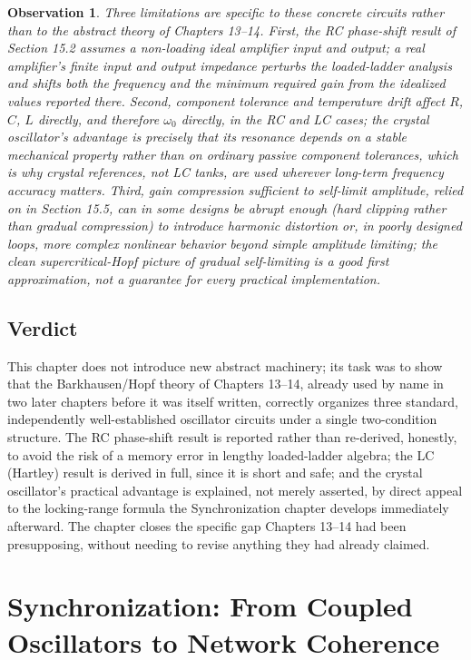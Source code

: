 \documentclass[12pt]{article}
\newtheorem{observation}{Observation}
\begin{document}
\begin{observation}
Three limitations are specific to these concrete circuits rather than to the abstract theory of Chapters 13--14. First, the RC phase-shift result of Section 15.2 assumes a non-loading ideal amplifier input and output; a real amplifier's finite input and output impedance perturbs the loaded-ladder analysis and shifts both the frequency and the minimum required gain from the idealized values reported there. Second, component tolerance and temperature drift affect $R$, $C$, $L$ directly, and therefore $\omega_0$ directly, in the RC and LC cases; the crystal oscillator's advantage is precisely that its resonance depends on a stable mechanical property rather than on ordinary passive component tolerances, which is why crystal references, not LC tanks, are used wherever long-term frequency accuracy matters. Third, gain compression sufficient to self-limit amplitude, relied on in Section 15.5, can in some designs be abrupt enough (hard clipping rather than gradual compression) to introduce harmonic distortion or, in poorly designed loops, more complex nonlinear behavior beyond simple amplitude limiting; the clean supercritical-Hopf picture of gradual self-limiting is a good first approximation, not a guarantee for every practical implementation.
\end{observation}

\subsection{Verdict}

This chapter does not introduce new abstract machinery; its task was to show that the Barkhausen/Hopf theory of Chapters 13--14, already used by name in two later chapters before it was itself written, correctly organizes three standard, independently well-established oscillator circuits under a single two-condition structure. The RC phase-shift result is reported rather than re-derived, honestly, to avoid the risk of a memory error in lengthy loaded-ladder algebra; the LC (Hartley) result is derived in full, since it is short and safe; and the crystal oscillator's practical advantage is explained, not merely asserted, by direct appeal to the locking-range formula the Synchronization chapter develops immediately afterward. The chapter closes the specific gap Chapters 13--14 had been presupposing, without needing to revise anything they had already claimed.

\section*{Synchronization: From Coupled Oscillators to Network Coherence}
\end{document}
